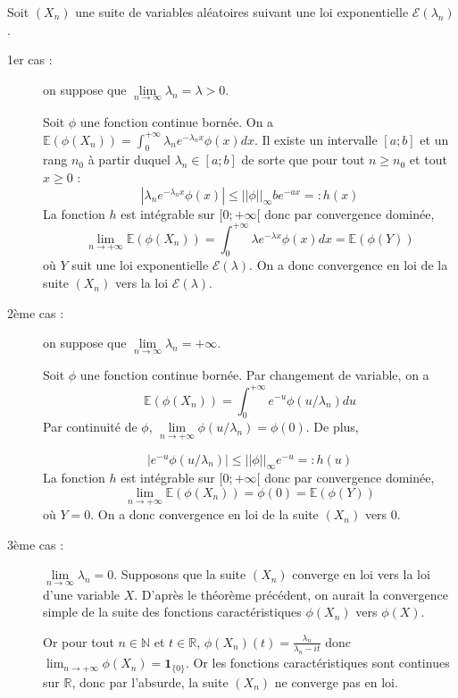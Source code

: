\begin{exemple}{}{}
Soit $(X_n)$ une suite de variables aléatoires suivant une loi exponentielle $\mathcal{E}(\lambda_n)$. 

\begin{description}
\item[1er cas : ] on suppose que $\lim\limits_{n \to \infty} \lambda_n= \lambda >0$. 

Soit $\phi$ une fonction continue bornée. On a $\mathbb{E}(\phi(X_n)) = \int_0^{+\infty} \lambda_n e^{-\lambda_n x}\phi(x)dx$. Il existe un intervalle $[a;b]$ et un rang $n_0$ à partir duquel $\lambda_n \in [a;b]$ de sorte que pour tout $n \geq n_0$ et tout $x \geq 0$ : $$|\lambda_n e^{-\lambda_n x}\phi(x)| \leq ||\phi||_{\infty}be^{-ax} =: h(x)$$
La fonction $h$ est intégrable sur $[0;+\infty[$ donc par convergence dominée, 
$$\lim_{n \to +\infty} \mathbb{E}(\phi(X_n)) = \int_0^{+\infty} \lambda e^{-\lambda x}\phi(x)dx = \mathbb{E}(\phi(Y))$$
où $Y$ suit une loi exponentielle $\mathcal{E}(\lambda)$. On a donc convergence en loi de la suite $(X_n)$ vers la loi $\mathcal{E}(\lambda)$.
\item[2ème cas : ] on suppose que $\lim\limits_{n \to \infty} \lambda_n= +\infty$. 

Soit $\phi$ une fonction continue bornée. Par changement de variable, on a $$\mathbb{E}(\phi(X_n)) = \int_0^{+\infty}  e^{- u}\phi(u/\lambda_n)du$$
 Par continuité de $\phi$, $\lim\limits_{n \to +\infty} \phi(u/\lambda_n) = \phi(0)$. De plus,

$$|e^{-u}\phi(u/\lambda_n)| \leq ||\phi||_{\infty}e^{-u} =: h(u)$$
La fonction $h$ est intégrable sur $[0;+\infty[$  donc par convergence dominée, 
$$\lim_{n \to +\infty} \mathbb{E}(\phi(X_n)) = \phi(0) = \mathbb{E}(\phi(Y))$$
où $Y=0$. On a donc convergence en loi de la suite $(X_n)$ vers $0$.

\item[3ème cas : ] $\lim\limits_{n \to \infty} \lambda_n= 0$. Supposons que la suite $(X_n)$ converge en loi vers la loi d'une variable $X$. D'après le théorème précédent, on aurait la convergence simple de la suite des fonctions caractéristiques $\phi(X_n)$ vers $\phi(X)$. 

Or pour tout $n \in \mathbb{N}$ et $t \in \mathbb{R}$, $\phi(X_n)(t) = \frac{\lambda_n}{\lambda_n-it}$ donc $\lim_{n \to +\infty} \phi(X_n) = \textbf{1}_{\{0\}}$. Or les fonctions caractéristiques sont continues sur $\mathbb{R}$, donc par l'absurde, la suite  $(X_n)$ ne converge pas en loi.

\end{description}
\end{exemple}






